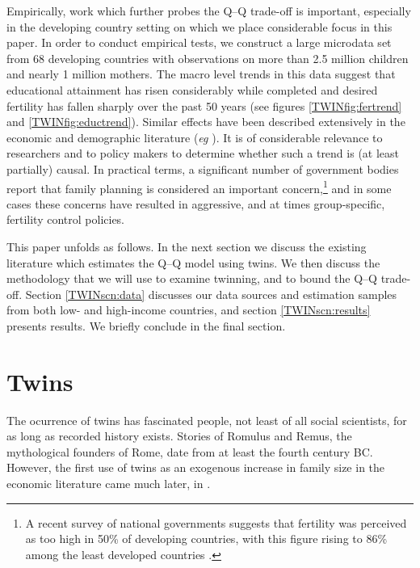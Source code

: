 \documentclass[subeqn]{article}
\begin{document}
\begin{spacing}{1.4}
Empirically, work which further probes the Q--Q trade-off is important,
especially in the developing country setting on which we place considerable 
focus in this paper. In order to conduct empirical tests, we construct a large 
microdata set from 68 developing countries with observations on more than 2.5 
million children and nearly 1 million mothers. The macro level trends in this 
data suggest that educational attainment has risen considerably while completed 
and desired fertility has fallen sharply over the past 50 years (see figures 
\ref{TWINfig:fertrend} and \ref{TWINfig:eductrend}). Similar effects have been 
described extensively in the economic and demographic literature (\emph{eg} 
\citet{Hanushek1992}). It is of considerable relevance to researchers and to 
policy makers to determine whether such a trend is (at least partially) causal.
In practical terms, a significant number of government bodies report that
family planning is considered an important concern,\footnote{A recent survey of 
national governments suggests that fertility was perceived as too high in 50\% 
of developing countries, with this figure rising to 86\% among the least 
developed countries \citet{UN2010}.}  and in some cases these concerns have 
resulted in aggressive, and at times group-specific, fertility control 
policies.  %

This paper unfolds as follows. In the next section we discuss the existing 
literature which estimates the Q--Q model using twins. We then discuss the 
methodology that we will use to examine twinning, and to bound the Q--Q 
trade-off.  Section \ref{TWINscn:data} discusses our data sources and 
estimation samples from both low- and high-income countries, and section 
\ref{TWINscn:results} presents results. We briefly conclude in the final 
section.

\section{Twins}                                    \label{TWINscn:literature}
The ocurrence of twins has fascinated people, not least of all social 
scientists, for as long as recorded history exists. Stories of Romulus and 
Remus, the mythological founders of Rome, date from at least the fourth century 
BC. However, the first use of twins as an exogenous increase in family size in 
the economic literature came much later, in \citet{RosenzweigWolpin1980}.


\end{spacing}
\end{document}
